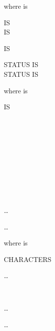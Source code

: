 where  is

\begin{syntax}
  \mnemonicname
  \begin{1=}
    IS  \\
    \integer IS \systemname \\
    \begin{0-1}
      IS \switchname
    \end{0-1}
    \begin{1+}
       STATUS IS \switchstatusname \\
       STATUS IS \switchstatusname
    \end{1+}
  \end{1=}
\end{syntax}

where  is

\begin{syntax}
    IS
  \begin{1=}
     \\
     \\
     \\
     \\
     \\
    \begin{1=}
      \literal
      \begin{0-1}
        \begin{1=}
           \\
        \end{1=}
        \literal \\
        \begin{1=}
           \literal
        \end{1=}\ldots
      \end{0-1}
    \end{1=}\ldots
  \end{1=}
\end{syntax}

where  is

\begin{syntax}
   CHARACTERS
  \begin{1=}
    \begin{1=}
    \end{1=}\ldots
    \begin{1=}
       \\
    \end{1=}
    \begin{1=}
      \integer
    \end{1=}\ldots
  \end{1=}\ldots
  \begin{0-1}
     
  \end{0-1}
\end{syntax}

